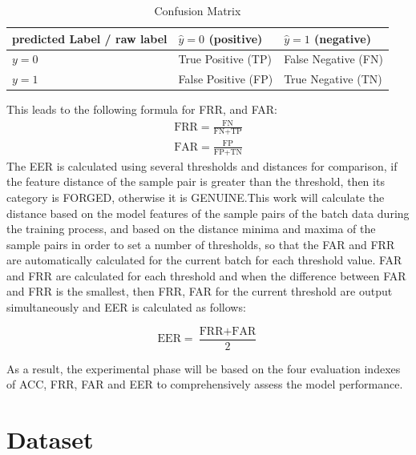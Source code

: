 \begin{table}[htbp]
\caption{Confusion Matrix}  
\begin{center}
\begin{tabu} to 0.8\textwidth{X[3, c]X[3, c]X[3, c]}  
\toprule
predicted Label / raw label & $\hat{y}=0$ (positive) & $\hat{y}=1$ (negative)\\
\midrule
$y=0$ &  True Positive (TP) & False Negative (FN) \\
$y=1$ & False Positive (FP) & True Negative (TN) \\
\bottomrule
\end{tabu}
\end{center}
\label{tab:cm}
\end{table}

This leads to the following formula for FRR, and FAR:
\begin{equation}
\label{eq21}
\begin{aligned}
	\text{FRR}=\frac{\text{FN}}{\text{FN}+\text{TP}} \\
	\text{FAR}=\frac{\text{FP}}{\text{FP}+\text{TN}}
\end{aligned}
\end{equation}
The EER is calculated using several thresholds and distances for comparison, if the feature distance of the sample pair is greater than the threshold, then its category is FORGED, otherwise it is GENUINE.This work will calculate the distance based on the model features of the sample pairs of the batch data during the training process, and based on the distance minima and maxima of the sample pairs in order to set a number of thresholds, so that the FAR and FRR are automatically calculated for the current batch for each threshold value. FAR and FRR are calculated for each threshold and when the difference between FAR and FRR is the smallest, then FRR, FAR for the current threshold are output simultaneously and EER is calculated as follows:

\begin{equation}
\label{eq22}
	\text{EER} = \frac{\text{FRR}+\text{FAR}}{2}	
\end{equation}
	
As a result, the experimental phase will be based on the four evaluation indexes of ACC, FRR, FAR and EER to comprehensively assess the model performance.

\newpage
\section{Dataset}

